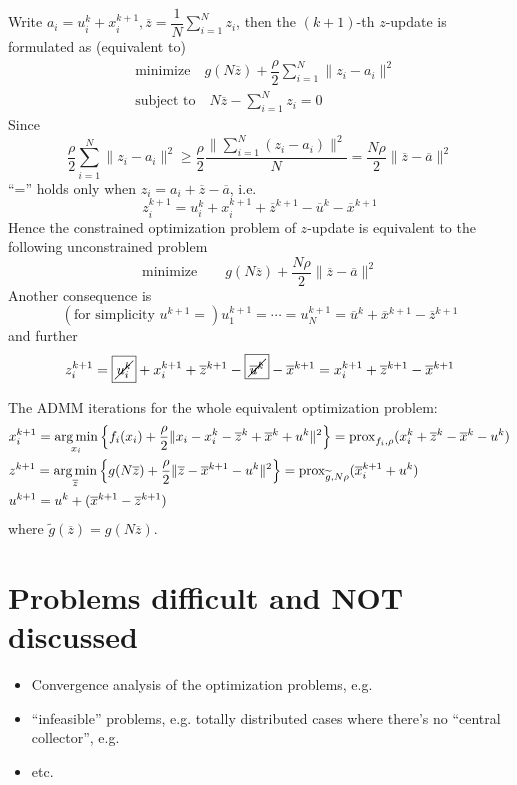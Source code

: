 Write $a_i = u_i^k + x_i^{k+1}, \overline{z} = \dfrac{1}{N} \sum\limits_{i=1}^N z_i$, then the $(k+1)$-th $z$-update is formulated as (equivalent to)
\begin{align*}
    & \text{minimize} \quad g(N\overline{z}) + \dfrac{\rho}{2} \sum\limits_{i=1}^N \lVert z_i - a_i \rVert^2 \\
    & \text{subject to} \quad N\overline{z} - \sum\limits_{i=1}^N z_i = 0
\end{align*}
Since
$$\dfrac{\rho}{2}\sum\limits_{i=1}^N \lVert z_i - a_i \rVert^2 \geqslant \dfrac{\rho}{2} \dfrac{\lVert \sum\limits_{i=1}^N(z_i - a_i) \rVert^2}{N} = \dfrac{N\rho}{2} \lVert \overline{z} - \overline{a} \rVert^2$$
``='' holds only when $z_i = a_i + \overline{z} - \overline{a}$, i.e.
$$z_i^{k+1} = u_i^{k} + x_i^{k+1} + \overline{z}^{k+1} - \overline{u}^{k} - \overline{x}^{k+1}$$
Hence the constrained optimization problem of $z$-update is equivalent to the following unconstrained problem
$$\text{minimize} \quad \quad g(N\overline{z}) + \dfrac{N\rho}{2} \lVert \overline{z} - \overline{a} \rVert^2$$
Another consequence is
$$(\text{for simplicity } u^{k+1} = ) u_1^{k+1} = \cdots = u_N^{k+1} = \overline{u}^k + \overline{x}^{k+1} - \overline{z}^{k+1}$$
and further
$$z_i^{k+1} = \framebox{$\cancel{u_i^{k}}$} + x_i^{k+1} + \overline{z}^{k+1} - \framebox{$\cancel{\overline{u}^{k}}$} - \overline{x}^{k+1} = x_i^{k+1} + \overline{z}^{k+1} - \overline{x}^{k+1}$$

The ADMM iterations for the whole equivalent optimization problem:
\begin{align*}
    & x_i^{k+1} = \operatorname*{arg\,min}_{x_i} \left\{ f_i(x_i) + \dfrac{\rho}{2} \lVert x_i - x_i^k - \overline{z}^k + \overline{x}^k + u^k \rVert^2 \right\} = \operatorname{prox}_{f_i,\rho}(x_i^k + \overline{z}^k - \overline{x}^k - u^k) \\
    & z^{k+1} = \operatorname*{arg\,min}\limits_{\overline{z}} \left\{ g(N\overline{z}) + \dfrac{\rho}{2} \lVert \overline{z} - \overline{x}^{k+1} - u^k \rVert^2 \right\}  = \operatorname{prox}_{\widetilde{g},N\rho}(\overline{x}_i^{k+1} + u^k) \\
    & u^{k+1} = u^k + (\overline{x}^{k+1}-\overline{z}^{k+1})
\end{align*}
where $\widetilde{g}(\overline{z}) = g(N\overline{z})$.

\section*{Problems difficult and NOT discussed}

\begin{itemize}
    \item Convergence analysis of the optimization problems, e.g. \cite{li2019convergence}
    \item ``infeasible'' problems, e.g. totally distributed cases where there's no ``central collector'', e.g. \cite{elgabli2020gadmm,issaid2020cq-ggadmm}
    \item etc.
\end{itemize}






